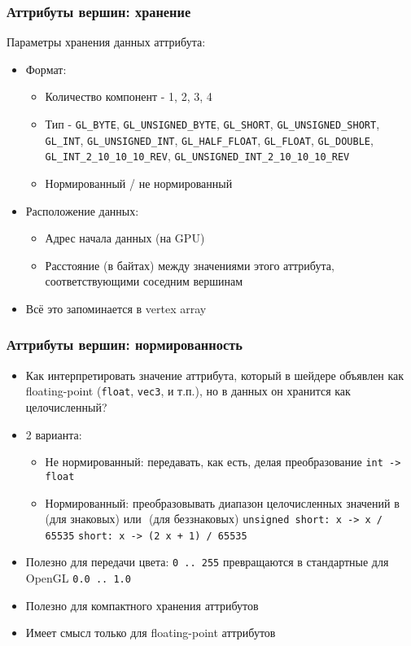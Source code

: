 \documentclass{beamer}
\begin{document}
\begin{frame}[fragile]
\frametitle{Аттрибуты вершин: хранение}
Параметры хранения данных аттрибута:
\begin{itemize}
\pause
\item Формат:
\begin{itemize}
\item Количество компонент - 1, 2, 3, 4
\pause
\item Тип - \verb|GL_BYTE|, \verb|GL_UNSIGNED_BYTE|, \verb|GL_SHORT|, \verb|GL_UNSIGNED_SHORT|, \verb|GL_INT|, \verb|GL_UNSIGNED_INT|, \verb|GL_HALF_FLOAT|, \verb|GL_FLOAT|, \verb|GL_DOUBLE|, \verb|GL_INT_2_10_10_10_REV|, \verb|GL_UNSIGNED_INT_2_10_10_10_REV|
\pause
\item Нормированный / не нормированный
\end{itemize}
\pause
\item Расположение данных:
\begin{itemize}
\item Адрес начала данных (на GPU)
\item Расстояние (в байтах) между значениями этого аттрибута, соответствующими соседним вершинам
\end{itemize}
\pause
\item Всё это запоминается в vertex array
\end{itemize}
\end{frame}

\begin{frame}[fragile]
\frametitle{Аттрибуты вершин: нормированность}
\begin{itemize}
\item Как интерпретировать значение аттрибута, который в шейдере объявлен как floating-point (\verb|float|, \verb|vec3|, и т.п.), но в данных он хранится как целочисленный?
\pause
\item 2 варианта:
\begin{itemize}
\item Не нормированный: передавать, как есть, делая преобразование \verb|int -> float|
\pause
\item Нормированный: преобразовывать диапазон целочисленных значений в \begin{math}[-1, 1]\end{math} (для знаковых) или \begin{math}[0, 1]\end{math} (для беззнаковых)
\verb|unsigned short: x -> x / 65535|
\verb|short: x -> (2 x + 1) / 65535|
\end{itemize}
\pause
\item Полезно для передачи цвета: \verb|0 .. 255| превращаются в стандартные для OpenGL \verb|0.0 .. 1.0|
\pause
\item Полезно для компактного хранения аттрибутов
\pause
\item Имеет смысл только для floating-point аттрибутов
\end{itemize}
\end{frame}
\end{document}

